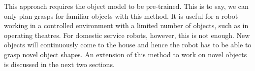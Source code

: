 This approach requires the object model to be pre-trained. This is to say, we can only plan grasps for familiar objects with this method. It is useful for a robot working in a controlled environment with a limited number of objects, such as in operating theatres. For domestic service robots, however, this is not enough. New objects will continuously come to the house and hence the robot has to be able to grasp novel object shapes. An extension of this method to work on novel objects is discussed in the next two sections.



